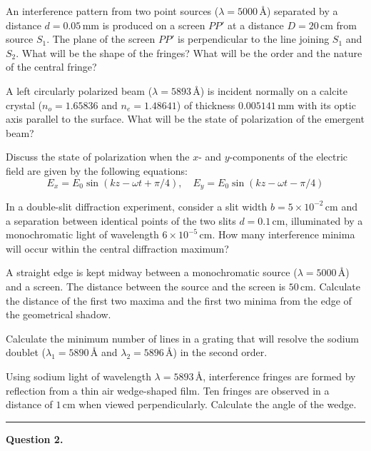 \documentclass[11pt,a4paper]{article}
\begin{document}
\begin{parts}
  \item An interference pattern from two point sources ($\lambda = 5000\, \text{\AA}$) separated by a distance $d = 0.05\, \text{mm}$ is produced on a screen $PP'$ at a distance $D = 20\, \text{cm}$ from source $S_1$. The plane of the screen $PP'$ is perpendicular to the line joining $S_1$ and $S_2$. What will be the shape of the fringes? What will be the order and the nature of the central fringe?
  \item A left circularly polarized beam ($\lambda = 5893\, \text{\AA}$) is incident normally on a calcite crystal ($n_o = 1.65836$ and $n_e = 1.48641$) of thickness $0.005141\, \text{mm}$ with its optic axis parallel to the surface. What will be the state of polarization of the emergent beam?
  \item Discuss the state of polarization when the $x$- and $y$-components of the electric field are given by the following equations:
    \[ E_x = E_0 \sin(kz - \omega t + \pi/4), \quad E_y = E_0 \sin(kz - \omega t - \pi/4) \]
  \item In a double-slit diffraction experiment, consider a slit width $b = 5  \times 10^{-2}\, \text{cm}$ and a separation between identical points of the two slits $d = 0.1\, \text{cm}$, illuminated by a monochromatic light of wavelength $6  \times 10^{-5}\, \text{cm}$. How many interference minima will occur within the central diffraction maximum?
  \item A straight edge is kept midway between a monochromatic source ($\lambda = 5000\, \text{\AA}$) and a screen. The distance between the source and the screen is $50\, \text{cm}$. Calculate the distance of the first two maxima and the first two minima from the edge of the geometrical shadow.
  \item Calculate the minimum number of lines in a grating that will resolve the sodium doublet ($\lambda_1 = 5890\, \text{\AA}$ and $\lambda_2 = 5896\, \text{\AA}$) in the second order.
  \item Using sodium light of wavelength $\lambda = 5893\, \text{\AA}$, interference fringes are formed by reflection from a thin air wedge-shaped film. Ten fringes are observed in a distance of $1\, \text{cm}$ when viewed perpendicularly. Calculate the angle of the wedge.
\end{parts}

\medskip\rule{\linewidth}{0.2pt}




\noindent   \textbf{Question 2.}
\end{document}
